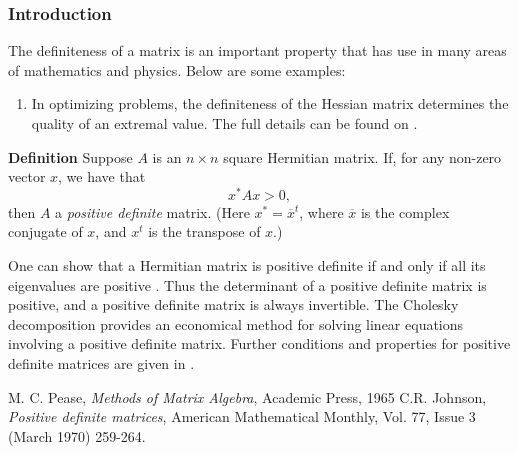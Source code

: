 \documentclass{article}
\begin{document}
\subsubsection*{Introduction}
The definiteness of a matrix is an important
property that has use in many areas of mathematics and  physics. 
Below are some examples:

\begin{enumerate}
\item In optimizing problems, the definiteness of the 
Hessian matrix determines the quality of an extremal value. 
The full details can be found on 
.
\end{enumerate}


{\bf Definition} \cite{pease}
Suppose $A$ is an $n\times n$ square Hermitian matrix. 
If, for any non-zero vector $x$, we have that
 $$x^\ast Ax>0,$$
then $A$ a \emph{positive definite} matrix. (Here $x^\ast=\overline{x}^t$,
where $\overline{x}$ is the complex conjugate of $x$, and $x^t$ is
the transpose of $x$.)

One can show that  a Hermitian matrix is positive definite if 
and only if all its eigenvalues are positive \cite{pease}. 
Thus the determinant of a positive definite matrix
is positive, and 
 a positive definite matrix is always invertible.
The Cholesky decomposition provides an economical method for
solving linear equations involving a positive definite matrix. 
Further conditions and properties for positive definite matrices
are given in \cite{johnson:pdm}.
 
\begin{thebibliography}{9}
 M. C. Pease,
 \emph{Methods of Matrix Algebra},
 Academic Press, 1965
 C.R. Johnson, \emph{Positive definite matrices},
  American Mathematical Monthly, Vol. 77, Issue 3 (March 1970) 259-264.
\end{thebibliography}
\end{document}
